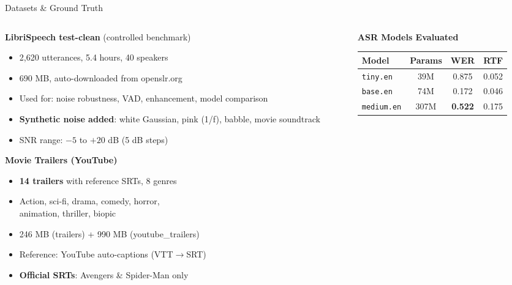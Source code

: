 \documentclass[aspectratio=169]{beamer}
\begin{document}
\begin{frame}{Datasets \& Ground Truth}
  \begin{columns}[T]
    \begin{column}{0.48\textwidth}
      \textbf{LibriSpeech test-clean} (controlled benchmark)
      \begin{itemize}
        \item 2,620 utterances, 5.4 hours, 40 speakers
        \item 690 MB, auto-downloaded from openslr.org
        \item Used for: noise robustness, VAD, enhancement, model comparison
        \item \textbf{Synthetic noise added}: white Gaussian, pink (1/f), babble, movie soundtrack
        \item SNR range: $-5$ to $+20$ dB (5 dB steps)
      \end{itemize}
      \vspace{0.2cm}
      \textbf{Movie Trailers (YouTube)}
      \begin{itemize}
        \item \textbf{14 trailers} with reference SRTs, 8 genres
        \item Action, sci-fi, drama, comedy, horror,\\animation, thriller, biopic
        \item 246 MB (trailers) + 990 MB (youtube\_trailers)
        \item Reference: YouTube auto-captions (VTT$\to$SRT)
        \item \textbf{Official SRTs}: Avengers \& Spider-Man only
      \end{itemize}
    \end{column}
    \begin{column}{0.48\textwidth}
      \textbf{ASR Models Evaluated}
      \begin{center}
        \small
        \begin{tabular}{@{}lccc@{}}
          \toprule
          Model & Params & WER & RTF \\
          \midrule
          \texttt{tiny.en} & 39M & 0.875 & 0.052 \\
          \texttt{base.en} & 74M & 0.172 & 0.046 \\
          \texttt{medium.en} & 307M & \textbf{0.522} & 0.175 \\
          \bottomrule
        \end{tabular}

\end{center}
\end{column}
\end{columns}
\end{frame}
\end{document}
